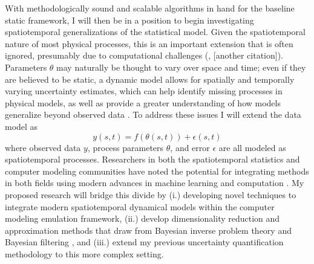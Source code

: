 \documentclass[12pt]{article}
\begin{document}
 
With methodologically sound and scalable algorithms in hand for the baseline static framework, I will then be in a position to begin investigating spatiotemporal generalizations of the statistical model. Given the spatiotemporal nature of most physical processes, this is an important extension that is often ignored, presumably due to computational challenges (\cite{Fer2}, [another citation]). Parameters $\theta$ may naturally be thought to vary over space
and time; even if they are believed to be static, a dynamic model allows for spatially and temporally varying uncertainty estimates, which can help identify 
missing processes in physical models, as well as provide a greater understanding of how models generalize beyond observed data \cite{Fer2, Dietze}. To address these issues I will extend the data model as 
  \[y(s, t) = f(\theta(s, t)) + \epsilon(s, t)\]
 where observed data $y$, process parameters $\theta$, and error $\epsilon$ are all modeled as spatiotemporal processes. Researchers in both the spatiotemporal statistics and computer modeling communities
have noted the potential for integrating methods in both fields using modern advances in machine learning and computation \cite{Wikle, Baker}. My proposed research will bridge this divide by (i.) developing novel techniques to integrate modern spatiotemporal dynamical models \cite{Wikle, Hefley}
within the computer modeling emulation framework, (ii.) develop dimensionality reduction and approximation methods that draw from Bayesian inverse problem 
theory \cite{Kugler} and Bayesian filtering \cite{Sarkka}, and (iii.) extend my previous uncertainty quantification methodology to this more complex setting. 
 
\end{document}
